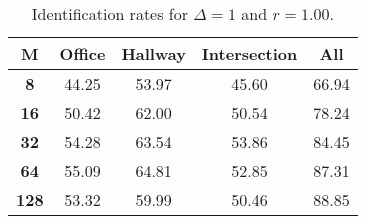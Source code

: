 \begin{table}[h]
    \footnotesize
    \centering
    \begin{tabular}{|c|c|c|c|l|}    
    \hline
    {\bf M} & {\bf Office} & {\bf Hallway} & {\bf Intersection} &     \multicolumn{1}{c|}{{\bf All}} \\ \hline
    {\bf 8} & 44.25 & 53.97 & 45.60 & 66.94 \\ \hline
    {\bf 16} & 50.42 & 62.00 & 50.54 & 78.24 \\ \hline
    {\bf 32} & 54.28 & 63.54 & 53.86 & 84.45 \\ \hline
    {\bf 64} & 55.09 & 64.81 & 52.85 & 87.31 \\ \hline
    {\bf 128} & 53.32 & 59.99 & 50.46 & 88.85 \\ \hline
    \end{tabular}
    \caption{Identification rates for $\Delta = 1$ and $r = 1.00$.}    
    \label{tab:identify_speakers_1.00_mit_19_1}
\end{table}
